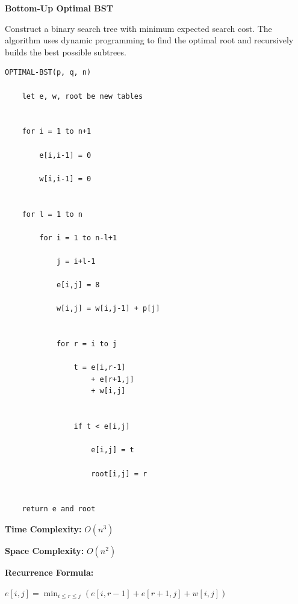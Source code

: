 \documentclass[a4paper,12pt]{article}
\begin{document}
\begin{tcolorbox}[
    colback=gray!30,
    colframe=black,
    boxrule=1pt,
    arc=0mm
]

\begin{tcolorbox}[
    colback=gray!10,
    colframe=black,
    arc=0mm
]
\centering
{\Huge\bfseries Bottom-Up Optimal BST}
\end{tcolorbox}


\begin{tcolorbox}[
    colback=gray!10,
    colframe=black,
    arc=0mm
]
\small
Construct a binary search tree with minimum expected search cost.
The algorithm uses dynamic programming to find the optimal root
and recursively builds the best possible subtrees.
\end{tcolorbox}


\begin{tcolorbox}[
    colback=black!5,
    colframe=black,
    arc=0mm,
    title=Pseudo-code
]
\tiny
\begin{lstlisting}
OPTIMAL-BST(p, q, n)

    let e, w, root be new tables


    for i = 1 to n+1

        e[i,i-1] = 0

        w[i,i-1] = 0


    for l = 1 to n

        for i = 1 to n-l+1

            j = i+l-1

            e[i,j] = 8

            w[i,j] = w[i,j-1] + p[j]


            for r = i to j

                t = e[i,r-1]
                    + e[r+1,j]
                    + w[i,j]


                if t < e[i,j]

                    e[i,j] = t

                    root[i,j] = r


    return e and root
\end{lstlisting}
\end{tcolorbox}


\begin{tcolorbox}[
    colback=cyan!20,
    colframe=black,
    arc=0mm
]
\small
\textbf{Time Complexity:}
$O(n^3)$
\end{tcolorbox}


\begin{tcolorbox}[
    colback=violet!20,
    colframe=black,
    arc=0mm
]
\small
\textbf{Space Complexity:}
$O(n^2)$
\end{tcolorbox}


\begin{tcolorbox}[
    colback=pink!20,
    colframe=black,
    arc=0mm
]
\small
\textbf{Recurrence Formula:}

$e[i,j]=\min_{i \leq r \leq j}
(e[i,r-1]+e[r+1,j]+w[i,j])$
\end{tcolorbox}

\end{tcolorbox}
\end{document}
